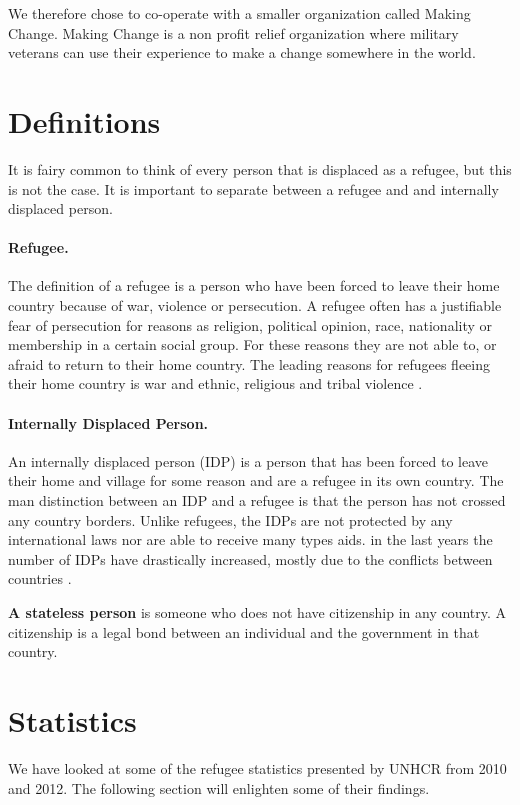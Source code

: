 We therefore chose to co-operate with a smaller organization called Making Change. Making Change is a non profit relief organization where military veterans can use their experience to make a change somewhere in the world.

\section{Definitions}
It is fairy common to think of every person that is displaced as a refugee, but this is not the case. It is important to separate between a refugee and and internally displaced person. 

\paragraph{Refugee.} The definition of a refugee is a person who have been forced to leave their home country because of war, violence or persecution. A refugee often has a justifiable fear of persecution for reasons as religion, political opinion, race, nationality or membership in a certain social group. For these reasons they are not able to, or
afraid to return to their home country. The leading reasons for refugees fleeing their home country is war and ethnic, religious and tribal violence \cite{refugeeDef}.

\paragraph{Internally Displaced Person.} An internally displaced person (IDP) is a person that has been forced to leave their home and village for some reason and are a refugee in its own country. The man distinction between an IDP and a refugee is that the person has not crossed any country borders. Unlike refugees, the IDPs are not protected by any international laws nor are able to receive many types aids. in the last years the number of IDPs have drastically increased, mostly due to the conflicts between countries \cite{refugeeDef}. 

\textbf{A stateless person} is someone who does not have citizenship in any country. A citizenship is a legal bond between an individual and the government in that country. 

\section{Statistics}
We have looked at some of the refugee statistics presented by UNHCR from 2010 and 2012. The following section will enlighten some of their findings. 

